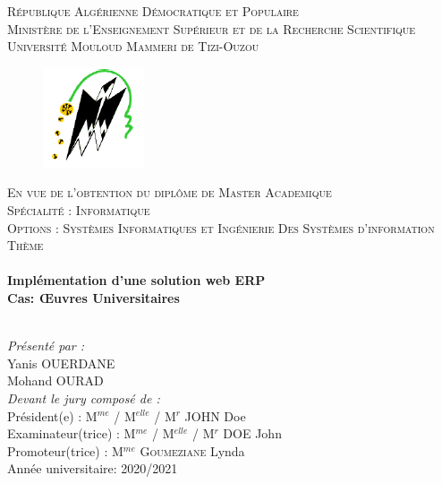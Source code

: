 \documentclass[11pt,a4paper,onecolumn,openright,oneside]{report}
\begin{document}
	\setcellgapes{3pt}
	
	\begin{titlepage}
		
		\begin{center}
			
			\textsc{\LARGE République Algérienne Démocratique et Populaire}\\
			\textsc{\LARGE Ministère de l’Enseignement Supérieur et de la Recherche Scientifique}\\
			\textsc{\LARGE Université Mouloud Mammeri de Tizi-Ouzou}\\
			
			\begin{figure}[H]
				\centering
				\includegraphics[scale=1.5]{ummto.PNG}
			\end{figure}
			
			\textsc{\Large En vue de l’obtention du diplôme de Master Academique}\\
			\textsc{\Large Spécialité : Informatique}\\
			\textsc{\Large Options : Systèmes Informatiques et Ingénierie Des Systèmes d’information}\\[1cm]
			
			
			\textsc{\Large Thème}\\
			\HRule \\[0.5cm]
            { \huge \bfseries Implémentation d'une solution web ERP \\
				Cas: Œuvres Universitaires \\[0.4cm] }
			
			\HRule \\[0.5cm]
			
			
			\emph{Présenté par :}\\
			
			Yanis \textsc{OUERDANE}\\
			Mohand \textsc{OURAD}\\[1.5cm]
			
			\emph{Devant le jury composé de :}\\
			
			\leftskip=4.5cm
			Président(e) : M$^{me}$ / M$^{elle}$ / M$^{r}$ JOHN Doe \\
			Examinateur(trice) : M$^{me}$ / M$^{elle}$ / M$^{r}$ DOE John\\
			Promoteur(trice) : M$^{me}$ \textsc{Goumeziane} Lynda \\ [1.5cm]
			
			
			\vfill
            {\large Année universitaire: 2020/2021}
			
		\end{center}
		
	\end{titlepage}
\end{document}
